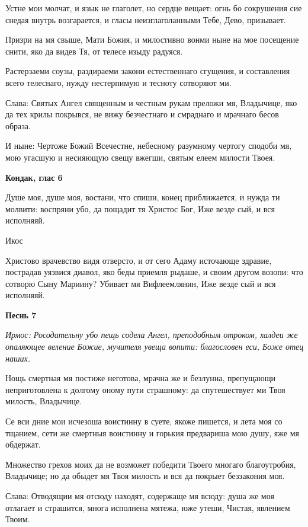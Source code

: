 Устне мои молчат, и язык не глаголет, но сердце вещает: огнь бо сокрушения сие снедая внутрь возгарается, и гласы неизглаголанными Тебе, Дево, призывает. 

Призри на мя свыше, Мати Божия, и милостивно вонми ныне на мое посещение снити, яко да видев Тя, от телесе изыду радуяся. 

Растерзаеми соузы, раздираеми закони естественнаго сгущения, и составления всего телеснаго, нужду нестерпимую и тесноту сотворяют ми. 

Слава: Святых Ангел священным и честным рукам преложи мя, Владычице, яко да тех крилы покрывся, не вижу безчестнаго и смраднаго и мрачнаго бесов образа. 

И ныне: Чертоже Божий Всечестне, небесному разумному чертогу сподоби мя, мою угасшую и несияющую свещу вжегши, святым елеем милости Твоея.


\medskip


\bfseries Кондак, глас 6\normalfont{}


Душе моя, душе моя, востани, что спиши, конец приближается, и нужда ти молвити: воспряни убо, да пощадит тя Христос Бог, Иже везде сый, и вся исполняяй. 

Икос 

Христово врачевство видя отверсто, и от сего Адаму источающе здравие, пострадав уязвися диавол, яко беды приемля рыдаше, и своим другом возопи: что сотворю Сыну Мариину? Убивает мя Вифлеемлянин, Иже везде сый и вся исполняяй.


\medskip


\bfseries Песнь 7\normalfont{}


\itshape Ирмос:\normalfont{} Росодательну убо пещь содела Ангел, преподобным отроком, халдеи же опаляющее веление Божие, мучителя увеща вопити: благословен еси, Боже отец наших. 

Нощь смертная мя постиже неготова, мрачна же и безлунна, препущающи неприготовлена к долгому оному пути страшному: да спутешествует ми Твоя милость, Владычице. 

Се вси дние мои исчезоша воистинну в суете, якоже пишется, и лета моя со тщанием, сети же смертныя воистинну и горькия предвариша мою душу, яже мя обдержат. 

Множество грехов моих да не возможет победити Твоего многаго благоутробия, Владычице; но да обыдет мя Твоя милость и вся да покрыет беззакония моя. 

Слава: Отводящии мя отсюду находят, содержаще мя всюду: душа же моя отлагает и страшится, многа исполнена мятежа, юже утеши, Чистая, явлением Твоим. 

